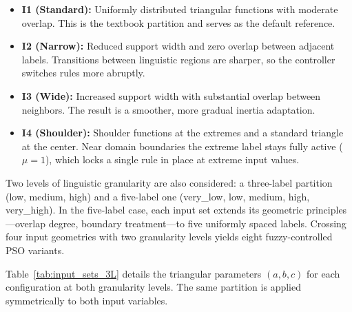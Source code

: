 \documentclass[conference]{IEEEtran}
\begin{document}
\begin{itemize}
    \item \textbf{I1 (Standard):} Uniformly distributed triangular functions with moderate overlap. This is the textbook partition and serves as the default reference.
    \item \textbf{I2 (Narrow):} Reduced support width and zero overlap between adjacent labels. Transitions between linguistic regions are sharper, so the controller switches rules more abruptly.
    \item \textbf{I3 (Wide):} Increased support width with substantial overlap between neighbors. The result is a smoother, more gradual inertia adaptation.
    \item \textbf{I4 (Shoulder):} Shoulder functions at the extremes and a standard triangle at the center. Near domain boundaries the extreme label stays fully active ($\mu = 1$), which locks a single rule in place at extreme input values.
\end{itemize}

Two levels of linguistic granularity are also considered: a three-label partition (low, medium, high) and a five-label one (very\_low, low, medium, high, very\_high). In the five-label case, each input set extends its geometric principles---overlap degree, boundary treatment---to five uniformly spaced labels. Crossing four input geometries with two granularity levels yields eight fuzzy-controlled PSO variants.

Table~\ref{tab:input_sets_3L} details the triangular parameters $(a, b, c)$ for each configuration at both granularity levels. The same partition is applied symmetrically to both input variables.
\end{document}
